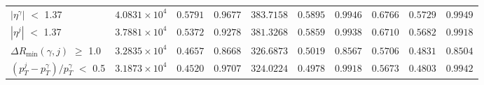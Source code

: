 {\begin{tabular}{|l|c|c|c|c|c|c|c|c|c|}
        \(|\eta^{\gamma}|\) \(<\) 1.37 & $4.0831\times 10^{4}$ & $0.5791$ & $0.9677$ & $383.7158$ & $0.5895$ & $0.9946$ & $0.6766$ & $0.5729$ & $0.9949$ \\
        \(|\eta^{j}|\) \(<\) 1.37 & $3.7881\times 10^{4}$ & $0.5372$ & $0.9278$ & $381.3268$ & $0.5859$ & $0.9938$ & $0.6710$ & $0.5682$ & $0.9918$ \\
        \(\Delta R_{\text{min}} (\gamma, j)\) \(\geq\) 1.0 & $3.2835\times 10^{4}$ & $0.4657$ & $0.8668$ & $326.6873$ & $0.5019$ & $0.8567$ & $0.5706$ & $0.4831$ & $0.8504$ \\
        \((p_{T}^{j} - p_{T}^{\gamma})/p_{T}^{\gamma}\) \(<\) 0.5 & $3.1873\times 10^{4}$ & $0.4520$ & $0.9707$ & $324.0224$ & $0.4978$ & $0.9918$ & $0.5673$ & $0.4803$ & $0.9942$ \\
        \hline
    \end{tabular}
}